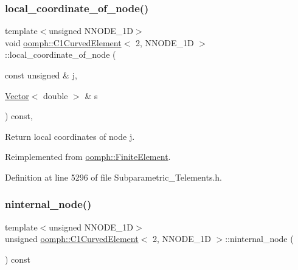 \subsubsection{\texorpdfstring{local\+\_\+coordinate\+\_\+of\+\_\+node()}{local\_coordinate\_of\_node()}}
{\footnotesize\ttfamily template$<$unsigned N\+N\+O\+D\+E\+\_\+1D$>$ \\
void \hyperlink{classoomph_1_1C1CurvedElement}{oomph\+::\+C1\+Curved\+Element}$<$ 2, N\+N\+O\+D\+E\+\_\+1D $>$\+::local\+\_\+coordinate\+\_\+of\+\_\+node (\begin{DoxyParamCaption}\item[{const unsigned \&}]{j,  }\item[{\hyperlink{classoomph_1_1Vector}{Vector}$<$ double $>$ \&}]{s }\end{DoxyParamCaption}) const\hspace{0.3cm}{\ttfamily [inline]}, {\ttfamily [virtual]}}



Return local coordinates of node j. 



Reimplemented from \hyperlink{classoomph_1_1FiniteElement_a22bc4ee35e4f948d8d7fba18c7b4f4c4}{oomph\+::\+Finite\+Element}.



Definition at line 5296 of file Subparametric\+\_\+\+Telements.\+h.

\mbox{\label{classoomph_1_1C1CurvedElement_3_012_00_01NNODE__1D_01_4_a038bf547d8348358f795f52cd3b7fb99}} 
\subsubsection{\texorpdfstring{ninternal\+\_\+node()}{ninternal\_node()}}
{\footnotesize\ttfamily template$<$unsigned N\+N\+O\+D\+E\+\_\+1D$>$ \\
unsigned \hyperlink{classoomph_1_1C1CurvedElement}{oomph\+::\+C1\+Curved\+Element}$<$ 2, N\+N\+O\+D\+E\+\_\+1D $>$\+::ninternal\+\_\+node (\begin{DoxyParamCaption}{ }\end{DoxyParamCaption}) const\hspace{0.3cm}{\ttfamily [inline]}}



